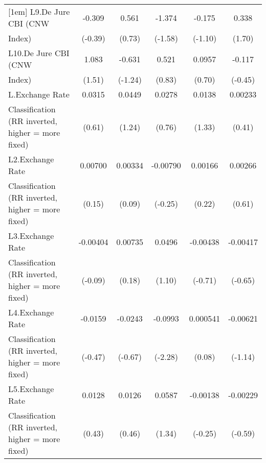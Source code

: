 {\begin{tabular}{l*{5}{c}}
[1em]
L9.De Jure CBI (CNW &      -0.309         &       0.561         &      -1.374         &      -0.175         &       0.338         \\
Index)              &     (-0.39)         &      (0.73)         &     (-1.58)         &     (-1.10)         &      (1.70)         \\
[1em]
L10.De Jure CBI (CNW&       1.083         &      -0.631         &       0.521         &      0.0957         &      -0.117         \\
Index)              &      (1.51)         &     (-1.24)         &      (0.83)         &      (0.70)         &     (-0.45)         \\
[1em]
L.Exchange Rate     &      0.0315         &      0.0449         &      0.0278         &      0.0138         &     0.00233         \\
Classification (RR inverted, higher = more fixed)&      (0.61)         &      (1.24)         &      (0.76)         &      (1.33)         &      (0.41)         \\
[1em]
L2.Exchange Rate    &     0.00700         &     0.00334         &    -0.00790         &     0.00166         &     0.00266         \\
Classification (RR inverted, higher = more fixed)&      (0.15)         &      (0.09)         &     (-0.25)         &      (0.22)         &      (0.61)         \\
[1em]
L3.Exchange Rate    &    -0.00404         &     0.00735         &      0.0496         &    -0.00438         &    -0.00417         \\
Classification (RR inverted, higher = more fixed)&     (-0.09)         &      (0.18)         &      (1.10)         &     (-0.71)         &     (-0.65)         \\
[1em]
L4.Exchange Rate    &     -0.0159         &     -0.0243         &     -0.0993\sym{*}  &    0.000541         &    -0.00621         \\
Classification (RR inverted, higher = more fixed)&     (-0.47)         &     (-0.67)         &     (-2.28)         &      (0.08)         &     (-1.14)         \\
[1em]
L5.Exchange Rate    &      0.0128         &      0.0126         &      0.0587         &    -0.00138         &    -0.00229         \\
Classification (RR inverted, higher = more fixed)&      (0.43)         &      (0.46)         &      (1.34)         &     (-0.25)         &     (-0.59)         \\

\end{tabular}}
